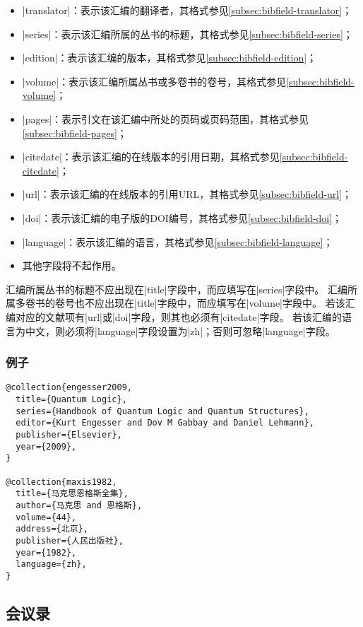 \begin{itemize}
\item |translator|：表示该汇编的翻译者，其格式参见\ref{subsec:bibfield-translator}；
\item |series|：表示该汇编所属的丛书的标题，其格式参见\ref{subsec:bibfield-series}；
\item |edition|：表示该汇编的版本，其格式参见\ref{subsec:bibfield-edition}；
\item |volume|：表示该汇编所属丛书或多卷书的卷号，其格式参见\ref{subsec:bibfield-volume}；
\item |pages|：表示引文在该汇编中所处的页码或页码范围，其格式参见\ref{subsec:bibfield-pages}；
\item |citedate|：表示该汇编的在线版本的引用日期，其格式参见\ref{subsec:bibfield-citedate}；
\item |url|：表示该汇编的在线版本的引用URL，其格式参见\ref{subsec:bibfield-url}；
\item |doi|：表示该汇编的电子版的DOI编号，其格式参见\ref{subsec:bibfield-doi}；
\item |language|：表示该汇编的语言，其格式参见\ref{subsec:bibfield-language}；
\item 其他字段将不起作用。
\end{itemize}

\begin{note}
汇编所属丛书的标题不应出现在|title|字段中，而应填写在|series|字段中。
汇编所属多卷书的卷号也不应出现在|title|字段中，而应填写在|volume|字段中。
若该汇编对应的文献项有|url|或|doi|字段，则其也必须有|citedate|字段。
若该汇编的语言为中文，则必须将|language|字段设置为|zh|；否则可忽略|language|字段。
\end{note}

\subsubsection{例子}

\begin{verbatim}
@collection{engesser2009,
  title={Quantum Logic},
  series={Handbook of Quantum Logic and Quantum Structures},
  editor={Kurt Engesser and Dov M Gabbay and Daniel Lehmann},
  publisher={Elsevier},  
  year={2009},  
}

@collection{maxis1982,
  title={马克思恩格斯全集},
  author={马克思 and 恩格斯},  
  volume={44},
  address={北京},
  publisher={人民出版社},
  year={1982},
  language={zh},
}
\end{verbatim}

\subsection{会议录}\label{subsec:bibtype-conference}

